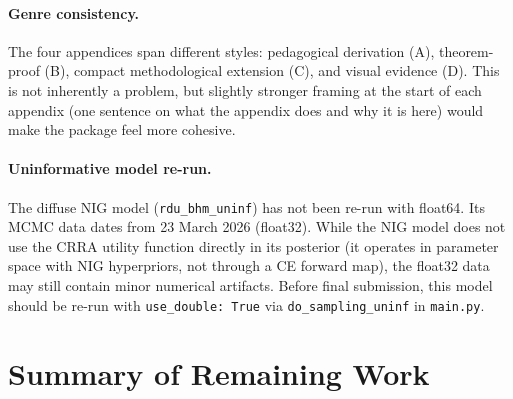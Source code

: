 \documentclass[11pt,a4paper]{article}
\begin{document}
\paragraph{Genre consistency.}
The four appendices span different styles: pedagogical derivation (A),
theorem-proof (B), compact methodological extension (C), and visual
evidence (D). This is not inherently a problem, but slightly stronger
framing at the start of each appendix (one sentence on what the appendix
does and why it is here) would make the package feel more cohesive.

\paragraph{Uninformative model re-run.}
The diffuse NIG model (\texttt{rdu\_bhm\_uninf}) has not been re-run
with float64. Its MCMC data dates from 23 March 2026 (float32). While
the NIG model does not use the CRRA utility function directly in its
posterior (it operates in parameter space with NIG hyperpriors, not
through a CE forward map), the float32 data may still contain minor
numerical artifacts. Before final submission, this model should be
re-run with \texttt{use\_double: True} via \texttt{do\_sampling\_uninf}
in \texttt{main.py}.


\section{Summary of Remaining Work}
\end{document}
